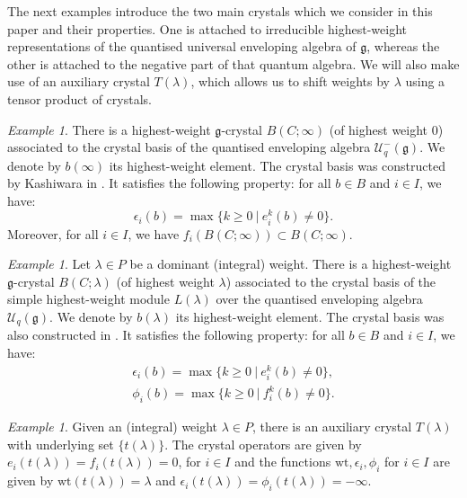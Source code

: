 \documentclass[a4paper,12pt]{article}
\theoremstyle{definition}
\theoremstyle{plain}
\theoremstyle{remark}
\newtheorem{example}[definition]{Example}
\begin{document}
The next examples introduce the two main crystals which we consider in this paper and their properties. One is attached to irreducible highest-weight representations of the quantised universal enveloping algebra of $\mathfrak{g}$, whereas the other is attached to the negative part of that quantum algebra. We will also make use of an auxiliary crystal $T(\lambda)$, which allows us to shift weights by $\lambda$ using a tensor product of crystals.

\begin{example}\label{Exmp/B(infty)}
There is a highest-weight $\mathfrak{g}$-crystal $B(C;\infty)$ (of highest weight $0$) associated to the crystal basis of the quantised enveloping algebra $\mathcal{U}_q^-(\mathfrak{g})$. We denote by $b(\infty)$ its highest-weight element. The crystal basis was constructed by Kashiwara in \cite{Kas91}. It satisfies the following property: for all $b\in B$ and $i\in I$, we have:
\[
\epsilon_i(b)=\max\{k\geq0\ \vert\ e_i^k(b)\ne0\}
.
\]
Moreover, for all $i\in I$, we have $f_i(B(C;\infty))\subset B(C;\infty)$.
\end{example}

\begin{example}\label{Exmp/B(lambda)}
Let $\lambda\in P$ be a dominant (integral) weight. There is a highest-weight $\mathfrak{g}$-crystal $B(C;\lambda)$ (of highest weight $\lambda$) associated to the crystal basis of the simple highest-weight module $L(\lambda)$ over the quantised enveloping algebra $\mathcal{U}_q(\mathfrak{g})$. We denote by $b(\lambda)$ its highest-weight element. The crystal basis was also constructed in \cite{Kas91}. It satisfies the following property: for all $b\in B$ and $i\in I$, we have:
\begin{align*}
\epsilon_i(b)=\max\{k\geq0\ \vert\ e_i^k(b)\ne0\} , \\
\phi_i(b)=\max\{k\geq0\ \vert\ f_i^k(b)\ne0\} .
\end{align*}
\end{example}

\begin{example}\label{Exmp/T(lambda)}
Given an (integral) weight $\lambda\in P$, there is an auxiliary crystal $T(\lambda)$ with underlying set $\{t(\lambda)\}$. The crystal operators are given by $e_i(t(\lambda))=f_i(t(\lambda))=0$, for $i\in I$ and the functions $\mathrm{wt},\epsilon_i,\phi_i$ for $ i\in I$ are given by $\mathrm{wt}(t(\lambda))=\lambda$ and $\epsilon_i(t(\lambda))=\phi_i(t(\lambda))=-\infty$.
\end{example}
\end{document}
